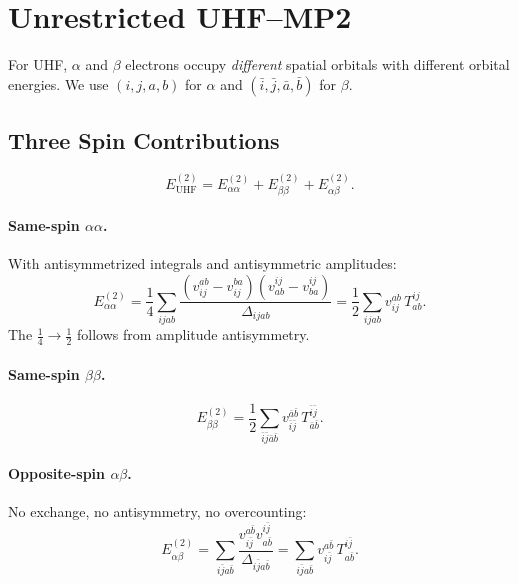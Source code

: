 \documentclass[a4paper,12pt,oneside]{book}
\newcommand{\spa}[1]{{#1}}
\newcommand{\spb}[1]{\bar{#1}}
\begin{document}
\section{Unrestricted UHF--MP2}
\label{sec:uhf-mp2}

For UHF, $\alpha$ and $\beta$ electrons occupy \emph{different} spatial orbitals 
with different orbital energies. We use $(\spa{i},\spa{j},\spa{a},\spa{b})$ for $\alpha$ 
and $(\spb{i},\spb{j},\spb{a},\spb{b})$ for $\beta$.

\subsection{Three Spin Contributions}
\begin{equation}
E^{(2)}_{\mathrm{UHF}} = E^{(2)}_{\alpha\alpha} + E^{(2)}_{\beta\beta} + E^{(2)}_{\alpha\beta}.
\end{equation}

\paragraph{Same-spin $\alpha\alpha$.}
With antisymmetrized integrals and antisymmetric amplitudes:
\begin{equation}
E^{(2)}_{\alpha\alpha} = \frac{1}{4} \sum_{\spa{i}\spa{j}\spa{a}\spa{b}}
\frac{(v_{\spa{i}\spa{j}}^{\spa{a}\spa{b}} - v_{\spa{i}\spa{j}}^{\spa{b}\spa{a}})(v^{\spa{i}\spa{j}}_{\spa{a}\spa{b}} - v^{\spa{i}\spa{j}}_{\spa{b}\spa{a}})}{\Delta_{\spa{i}\spa{j}\spa{a}\spa{b}}}
= \frac{1}{2} \sum_{\spa{i}\spa{j}\spa{a}\spa{b}} v_{\spa{i}\spa{j}}^{\spa{a}\spa{b}} \, T^{\spa{i}\spa{j}}_{\spa{a}\spa{b}}.
\end{equation}
The $\tfrac{1}{4} \to \tfrac{1}{2}$ follows from amplitude antisymmetry.

\paragraph{Same-spin $\beta\beta$.}
\begin{equation}
E^{(2)}_{\beta\beta} = \frac{1}{2} \sum_{\spb{i}\spb{j}\spb{a}\spb{b}} v_{\spb{i}\spb{j}}^{\spb{a}\spb{b}} \, T^{\spb{i}\spb{j}}_{\spb{a}\spb{b}}.
\end{equation}

\paragraph{Opposite-spin $\alpha\beta$.}
No exchange, no antisymmetry, no overcounting:
\begin{equation}
E^{(2)}_{\alpha\beta} = \sum_{\spa{i}\spb{j}\spa{a}\spb{b}} \frac{v_{\spa{i}\spb{j}}^{\spa{a}\spb{b}}v^{\spa{i}\spb{j}}_{\spa{a}\spb{b}}}{\Delta_{\spa{i}\spb{j}\spa{a}\spb{b}}}
= \sum_{\spa{i}\spb{j}\spa{a}\spb{b}} v_{\spa{i}\spb{j}}^{\spa{a}\spb{b}} \, T^{\spa{i}\spb{j}}_{\spa{a}\spb{b}}.
\end{equation}
\end{document}

